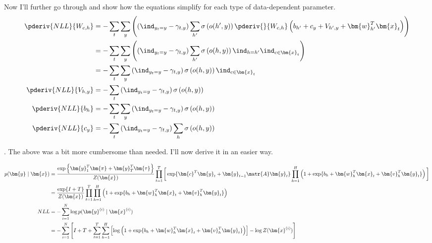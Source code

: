 \documentclass[11pt]{article}
\renewcommand\vec[2][]{\bm{#2}_{#1}}
\newcommand\myspace[1][]{\vspace{#1\bigskipamount}}
\newcommand\p{\Needspace{10\baselineskip} \noindent}
\begin{document}
Now I'll further go through and show how the equations simplify for each type of data-dependent parameter.
\begin{align}
	\pderiv{NLL}{W_{c,h}}
		&= -\sum_t \sum_y \left( \left(
		\ind_{y_t = y} -  \gamma_{t,y} \right) 
		\sum_{h'}   \sigma\left(o(h', y)\right) \pderiv{}{W_{c,h}} \left( b_{h'} + c_y + V_{h',y} + \vec[h']{w}^T \vec[t]{x}  \right) \right) \\
		&= -\sum_t \sum_y \left( \left(
		\ind_{y_t = y} -  \gamma_{t,y} \right) 
		\sum_{h'}  \sigma\left(o(h, y)\right) \ind_{h=h'}\ind_{c \in \vec[t]{x}} \right) \\
		&= -\sum_t \sum_y \left( 
		\ind_{y_t = y} -  \gamma_{t,y} \right) 
		 \sigma\left(o(h, y)\right) \ind_{c \in \vec[t]{x}}  \\
	\pderiv{NLL}{V_{h,y}} 
		&= -\sum_t \left( 
		\ind_{y_t = y} -  \gamma_{t,y} \right) 
		\sigma\left(o(h, y)\right)   \\
	\pderiv{NLL}{b_h}
		&= -\sum_t \sum_y \left( 
		\ind_{y_t = y} -  \gamma_{t,y} \right) 
		\sigma\left(o(h, y)\right)  \\
	\pderiv{NLL}{c_y}
		&= -\sum_t  \left( 
		\ind_{y_t = y} -  \gamma_{t,y} \right) 
		\sum_h \sigma\left(o(h, y)\right)   \\
\end{align}


\myspace
\p {}. The above was a bit more cumbersome than needed. I'll now derive it in an easier way. 

\begin{small}
	\begin{align}
	p(\vec y \mid \vec x) 
	&= \frac{\exp\left\{ \vec[1]{y}^T \vec{\pi} + \vec[T]{y}^T \vec{\tau}  \right\}}{Z(\vec x)} \prod_{t=1}^{T}\bigg[ 
	\exp\{ \vec{c}^T \vec[t]{y} + \vec[t-1]{y}\matr{A}\vec[t]{y}   \}  
	\prod_{h = 1}^{H} \left( 1 + \exp\{ b_h + \vec[h]{w}^T \vec[t]{x} + \vec[h]{v}^T \vec[t]{y}  \} \right)	\bigg] \\
	&= \frac{\exp\{ I + T \}}{Z(\vec x)} \prod_{t=1}^{T}
	\prod_{h = 1}^{H} \left( 1 + \exp\{ b_h + \vec[h]{w}^T \vec[t]{x} + \vec[h]{v}^T \vec[t]{y}  \} \right)
	\\
	NLL 
		&= - \sum_{i=1}^{N} \log p(\vec{y}^{(i)} \mid \vec{x}^{(i)}) \\
		&= - \sum_{i=1}^{N} \left[ 
		I + T + 
		\sum_{t = 1}^{T} \sum_{h=1}^{H} \left[ \log \left( 1 + \exp\{ b_h + \vec[h]{w}^T \vec[t]{x} + \vec[h]{v}^T \vec[t]{y}  \} \right) \right]
		- \log Z(\vec{x}^{(i)})
		\right]
	\end{align}
\end{small}
\end{document}
